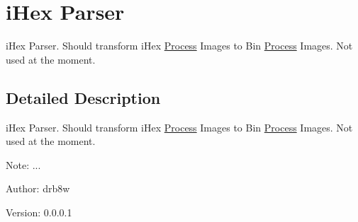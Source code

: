 \hypertarget{group___v_m_m___h_e_x}{
\section{iHex Parser}
\label{group___v_m_m___h_e_x}
}
iHex Parser. Should transform iHex \hyperlink{struct_process}{Process} Images to Bin \hyperlink{struct_process}{Process} Images. Not used at the moment.  




\subsection{Detailed Description}
iHex Parser. Should transform iHex \hyperlink{struct_process}{Process} Images to Bin \hyperlink{struct_process}{Process} Images. Not used at the moment. 

\begin{Desc}
\item[Note:]... \end{Desc}
\begin{Desc}
\item[Author:]drb8w \end{Desc}
\begin{Desc}
\item[Version:]0.0.0.1 \end{Desc}
